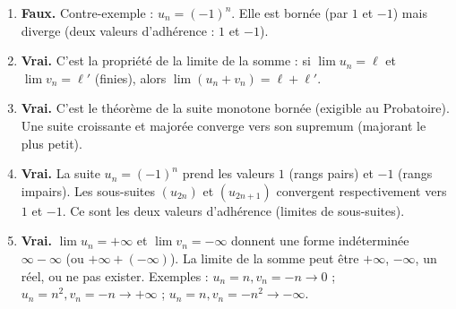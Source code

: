 \documentclass[11pt]{article}
\begin{document}
\begin{corrige}
\begin{enumerate}
    \item \textbf{Faux.}
    Contre-exemple : $u_n = (-1)^n$. Elle est bornée (par $1$ et $-1$) mais diverge (deux valeurs d'adhérence : $1$ et $-1$).
    \item \textbf{Vrai.}
    C'est la propriété de la limite de la somme : si $\lim u_n = \ell$ et $\lim v_n = \ell'$ (finies), alors $\lim (u_n+v_n) = \ell+\ell'$.
    \item \textbf{Vrai.}
    C'est le théorème de la suite monotone bornée (exigible au Probatoire). Une suite croissante et majorée converge vers son supremum (majorant le plus petit).
    \item \textbf{Vrai.}
    La suite $u_n = (-1)^n$ prend les valeurs $1$ (rangs pairs) et $-1$ (rangs impairs). Les sous-suites $(u_{2n})$ et $(u_{2n+1})$ convergent respectivement vers $1$ et $-1$. Ce sont les deux valeurs d'adhérence (limites de sous-suites).
    \item \textbf{Vrai.}
    $\lim u_n = +\infty$ et $\lim v_n = -\infty$ donnent une forme indéterminée $\infty - \infty$ (ou $+\infty + (-\infty)$). La limite de la somme peut être $+\infty$, $-\infty$, un réel, ou ne pas exister. Exemples : $u_n=n, v_n=-n \to 0$ ; $u_n=n^2, v_n=-n \to +\infty$ ; $u_n=n, v_n=-n^2 \to -\infty$.
\end{enumerate}
\end{corrige}
\end{document}
